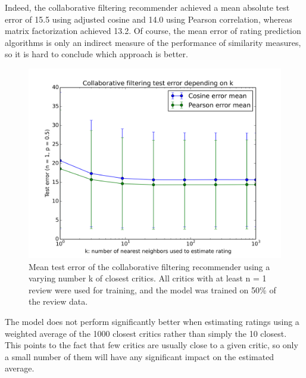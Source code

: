 \documentclass[12pt]{article}
\newcommand{\matrixtesterror}{13.2}
\begin{document}
Indeed, the collaborative filtering recommender achieved a mean absolute test
error of 15.5 using adjusted cosine and 14.0 using Pearson correlation, whereas
matrix factorization achieved \matrixtesterror. Of course, the mean error of
rating prediction algorithms is only an indirect measure of the performance of
similarity measures, so it is hard to conclude which approach is better.

\begin{figure}[H]
\centering
\includegraphics[width=\textwidth]{../plots/collab/graph_k.png}
\caption{Mean test error of the collaborative filtering recommender using a
    varying number k of closest critics. All critics with at least n = 1
    review were used for training, and the model was trained on 50\% of the
    review data.}
\label{fig:collab_p}
\end{figure}

The model does not perform significantly better when estimating ratings using
a weighted average of the 1000 closest critics rather than simply the 10
closest. This points to the fact that few critics are usually close to a given
critic, so only a small number of them will have any significant impact on
the estimated average.
\end{document}
